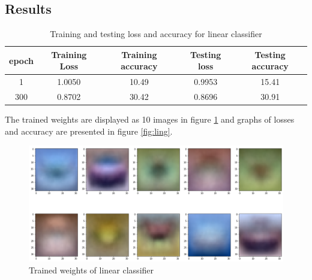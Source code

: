 \documentclass[a4paper, 12pt]{article}
\begin{document}
		\subsection{Results}
			\begin{table}[h]
				\centering
				\begin{tabular}{|c|c|c|c|c|}
					\hline
					epoch & Training Loss & Training accuracy & Testing loss & Testing accuracy\\
					\hline
					1 & 1.0050 & 10.49 & 0.9953 & 15.41 \\
					300 & 0.8702 & 30.42 & 0.8696 & 30.91\\
					\hline
				\end{tabular}
				\caption{Training and testing loss and accuracy for linear classifier}
			\end{table}
			The trained weights are displayed as 10 images in figure \ref{fig:weights} and graphs of losses and accuracy are presented in figure \ref{fig:ling}.
			\begin{figure}
				\centering
				\includegraphics[scale = 0.4]{../images/weights}
				\caption{Trained weights of linear classifier}
				\label{fig:weights}
			\end{figure}
\end{document}

